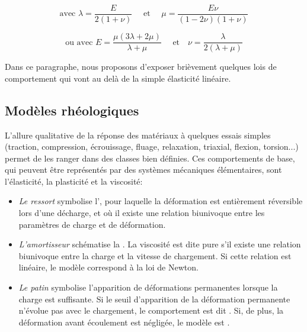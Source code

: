 \begin{equation}\text{avec } \lambda=\dfrac{E}{2(1+\nu)} \quad \text{ et } \quad \mu=\dfrac{E\nu}{(1-2\nu)(1+\nu)} \end{equation}

\begin{equation} \text{ou avec } E=\dfrac{\mu(3\lambda+2\mu)}{\lambda+\mu} \quad\text{ et}\quad
\nu=\dfrac{\lambda}{2(\lambda+\mu)} \end{equation}

\medskip
Dans ce paragraphe, nous proposons d'exposer brièvement quelques lois de
comportement qui vont au delà de la simple élasticité linéaire.




\medskip
\subsection{Modèles rhéologiques}

\medskip
L'allure qualitative de la réponse des matériaux à quelques essais simples (traction, compression,
écrouissage, fluage, relaxation, triaxial, flexion, torsion...) permet de les ranger dans des classes bien 
définies.
Ces comportements \og de base\fg{}, qui peuvent être représentés par des systèmes mécaniques 
élémentaires, sont l'élasticité, la plasticité et la viscosité:
\begin{itemize}
   \item \emph{Le ressort} symbolise l', pour laquelle la 
	déformation est entièrement réversible lors d'une décharge, et où il existe une relation 
	biunivoque entre les paramètres de charge et de déformation.
   \item \emph{L'amortisseur} schématise la . 
	La viscosité est dite pure s'il existe une relation biunivoque entre la charge et la vitesse de chargement. 
	Si cette relation est linéaire, 	le modèle correspond à la loi de Newton.
   \item \emph{Le patin} symbolise l'apparition de déformations permanentes lorsque la 
	charge est suffisante. 
	Si le seuil d'apparition de la déformation permanente n'évolue pas avec le chargement, le 
	comportement est dit .
	Si, de plus, la déformation avant écoulement est négligée, le modèle est 
	.
\end{itemize}

